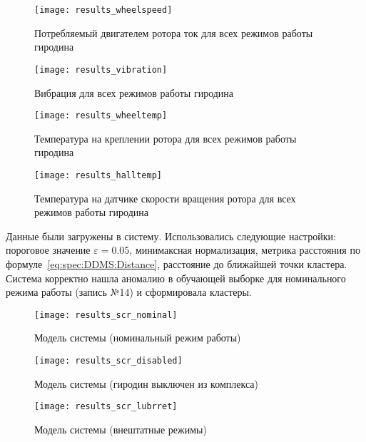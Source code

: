 \begin{figure}[h]
\texttt{[image: results\_wheelspeed]}
\caption{Потребляемый двигателем ротора ток для всех режимов работы гиродина}
\label{fig:spec:results:current}
\end{figure}

\begin{figure}[h]
\texttt{[image: results\_vibration]}
\caption{Вибрация для всех режимов работы гиродина}
\label{fig:spec:results:vibration}
\end{figure}

\begin{figure}[h]
\texttt{[image: results\_wheeltemp]}
\caption{Температура на креплении ротора для всех режимов работы гиродина}
\label{fig:spec:results:wheeltemp}
\end{figure}

\begin{figure}[h]
\texttt{[image: results\_halltemp]}
\caption{Температура на датчике скорости вращения ротора для всех режимов работы гиродина}
\label{fig:spec:results:halltemp}
\end{figure}

Данные были загружены в систему. Использовались следующие настройки: пороговое значение $\varepsilon=0.05$, минимаксная нормализация, метрика расстояния по формуле~\eqref{eq:spec:DDMS:Distance}, расстояние до ближайшей точки кластера. Система корректно нашла аномалию в обучающей выборке для номинального режима работы (запись №14) и сформировала кластеры.

\begin{figure}
\caption{Модель системы (номинальный режим работы)}
\label{fig:spec:results:scr:nominal}
\texttt{[image: results\_scr\_nominal]}
\end{figure}

\begin{figure}
\caption{Модель системы (гиродин выключен из комплекса)}
\label{fig:spec:results:scr:disabled}
\texttt{[image: results\_scr\_disabled]}
\end{figure}

\begin{figure}
\caption{Модель системы (внештатные режимы)}
\label{fig:spec:results:scr:lubrret}
\texttt{[image: results\_scr\_lubrret]}
\end{figure}